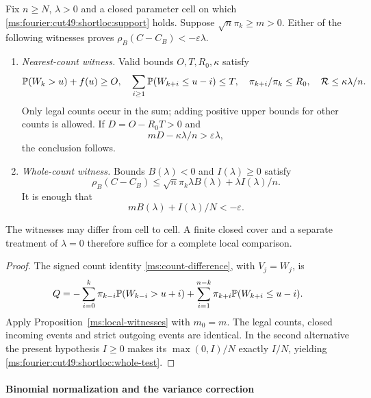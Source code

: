 \begin{theorem}\label{ms:fourier:cut49:shortloc:theorem}
Fix $n\ge N$, $\lambda>0$ and a closed parameter cell on which
\eqref{ms:fourier:cut49:shortloc:support} holds. Suppose $\sqrt n\pi_k\ge m>0$.
Either of the following witnesses proves $\rho_B(C-C_B)<-\varepsilon\lambda$.
\begin{enumerate}
\item \emph{Nearest-count witness.} Valid bounds $O,T,R_0,\kappa$ satisfy
\[
 \mathbb P(W_k>u)+f(u)\ge O,\quad
 \sum_{i\ge1}\mathbb P(W_{k+i}\le u-i)\le T,\quad
 \pi_{k+i}/\pi_k\le R_0,\quad \mathcal R\le\kappa\lambda/n.
\]
Only legal counts occur in the sum; adding positive upper bounds for
other counts is allowed. If $D=O-R_0T>0$ and
\begin{equation}\label{ms:fourier:cut49:shortloc:directtest}
             mD-\kappa\lambda/n>\varepsilon\lambda,
\end{equation}
the conclusion follows.
\item \emph{Whole-count witness.} Bounds $B(\lambda)<0$ and $I(\lambda)\ge0$
satisfy
\[
 \rho_B(C-C_B)\le\sqrt n\pi_k\lambda B(\lambda)
                                      +\lambda I(\lambda)/n.
\]
It is enough that
\begin{equation}\label{ms:fourier:cut49:shortloc:whole-test}
                  mB(\lambda)+I(\lambda)/N<-\varepsilon.
\end{equation}
\end{enumerate}
The witnesses may differ from cell to cell. A finite closed cover and a
separate treatment of $\lambda=0$ therefore suffice for a complete local
comparison.
\end{theorem}
\begin{proof}
The signed count identity \eqref{ms:count-difference}, with $V_j=W_j$, is
\begin{equation}\label{ms:fourier:cut49:shortloc:count}
 Q=-\sum_{i=0}^{k}\pi_{k-i}\mathbb P(W_{k-i}>u+i)
       +\sum_{i=1}^{n-k}\pi_{k+i}\mathbb P(W_{k+i}\le u-i).
\end{equation}
Apply Proposition~\ref{ms:local-witnesses} with $m_0=m$.
The legal counts, closed incoming events and strict outgoing events are
identical. In the second alternative the present hypothesis $I\ge0$
makes its $\max(0,I)/N$ exactly $I/N$, yielding
\eqref{ms:fourier:cut49:shortloc:whole-test}.
\end{proof}

\paragraph{Binomial normalization and the variance correction}

